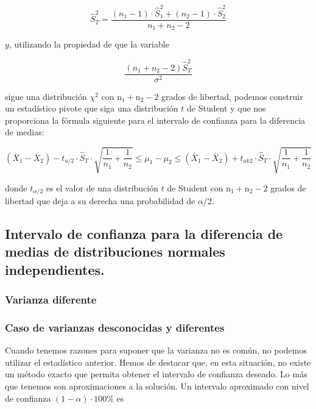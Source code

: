 \documentclass[
]{article}
\begin{document}
\[
\hat{S}_{T}^{2}=\frac{\left(n_{1}-1\right) \cdot \hat{S}_{1}^{2}+\left(n_{2}-1\right) \cdot \hat{S}_{2}^{2}}{n_{1}+n_{2}-2}
\]

\(y\), utilizando la propiedad de que la variable

\[
\frac{\left(n_{1}+n_{2}-2\right) \hat{S}_{T}^{2}}{\sigma^{2}}
\]

sigue una distribución \(\chi^{2}\) con \(\mathrm{n}_{1}+\mathrm{n}_{2}-2\) grados de libertad, podemos construir un estadístico pivote que siga una distribución \(t\) de Student y que nos proporciona la fórmula siguiente para el intervalo de
confianza para la diferencia de medias:

\[
\left(\bar{X}_{1}-\bar{X}_{2}\right)-t_{a / 2} \cdot \hat{S}_{T} \cdot \sqrt{\frac{1}{n_{1}}+\frac{1}{n_{2}}} \leq \mu_{1}-\mu_{2} \leq\left(\bar{X}_{1}-\bar{X}_{2}\right)+t_{a k 2} \cdot \hat{S}_{T} \cdot \sqrt{\frac{1}{n_{1}}+\frac{1}{n_{2}}}
\]

donde \(t_{\alpha / 2}\) es el valor de una distribución \(t\) de Student con \(\mathrm{n}_{1}+\mathrm{n}_{2}-2\) grados de libertad que deja a su derecha una probabilidad de \(\alpha / 2\).

\subsection{Intervalo de confianza para la diferencia de medias de distribuciones normales independientes.}\label{intervalo-de-confianza-para-la-diferencia-de-medias-de-distribuciones-normales-independientes.-1}

\subsubsection{Varianza diferente}\label{varianza-diferente}

\subsubsection{Caso de varianzas desconocidas y diferentes}\label{caso-de-varianzas-desconocidas-y-diferentes}

Cuando tenemos razones para suponer que la varianza no es común, no podemos utilizar el estadístico anterior. Hemos de destacar que, en esta situación, no existe un método exacto que permita obtener el intervalo de confianza deseado. Lo más que tenemos son aproximaciones a la solución. Un intervalo aproximado con nivel de confianza \((1-\alpha) \cdot 100 \%\) es
\end{document}
